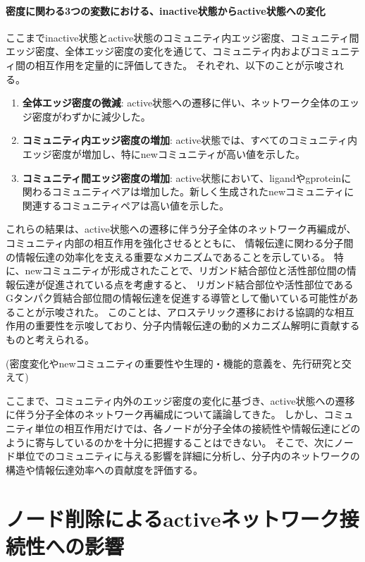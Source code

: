 \paragraph{密度に関わる3つの変数における、inactive状態からactive状態への変化}

ここまでinactive状態とactive状態のコミュニティ内エッジ密度、コミュニティ間エッジ密度、全体エッジ密度の変化を通じて、コミュニティ内およびコミュニティ間の相互作用を定量的に評価してきた。
それぞれ、以下のことが示唆される。
\begin{enumerate}
  \item \textbf{全体エッジ密度の微減}: active状態への遷移に伴い、ネットワーク全体のエッジ密度がわずかに減少した。
  \item \textbf{コミュニティ内エッジ密度の増加}: active状態では、すべてのコミュニティ内エッジ密度が増加し、特にnewコミュニティが高い値を示した。
  \item \textbf{コミュニティ間エッジ密度の増加}: active状態において、ligandやgproteinに関わるコミュニティペアは増加した。新しく生成されたnewコミュニティに関連するコミュニティペアは高い値を示した。
\end{enumerate}

これらの結果は、active状態への遷移に伴う分子全体のネットワーク再編成が、
コミュニティ内部の相互作用を強化させるとともに、
情報伝達に関わる分子間の情報伝達の効率化を支える重要なメカニズムであることを示している。
特に、newコミュニティが形成されたことで、リガンド結合部位と活性部位間の情報伝達が促進されている点を考慮すると、
リガンド結合部位や活性部位であるGタンパク質結合部位間の情報伝達を促進する導管として働いている可能性があることが示唆された。
このことは、アロステリック遷移における協調的な相互作用の重要性を示唆しており、分子内情報伝達の動的メカニズム解明に貢献するものと考えられる。

(密度変化やnewコミュニティの重要性や生理的・機能的意義を、先行研究と交えて)

ここまで、コミュニティ内外のエッジ密度の変化に基づき、active状態への遷移に伴う分子全体のネットワーク再編成について議論してきた。
しかし、コミュニティ単位の相互作用だけでは、各ノードが分子全体の接続性や情報伝達にどのように寄与しているのかを十分に把握することはできない。
そこで、次にノード単位でのコミュニティに与える影響を詳細に分析し、分子内のネットワークの構造や情報伝達効率への貢献度を評価する。


\section{ノード削除によるactiveネットワーク接続性への影響}

